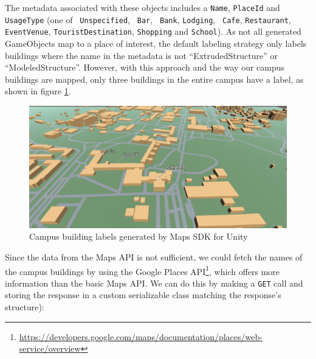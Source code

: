            The metadata associated with these objects includes a \texttt{Name}, \texttt{PlaceId} and \texttt{UsageType} (one of \texttt{ Unspecified}, \texttt{ Bar}, \texttt{ Bank}, \texttt{Lodging}, \texttt{ Cafe}, \texttt{Restaurant}, \texttt{EventVenue}, \texttt{TouristDestination}, \texttt{Shopping} and \texttt{School}). As not all generated GameObjects map to a place of interest, the default labeling strategy only labels buildings where the name in the metadata is not “ExtrudedStructure” or “ModeledStructure”. However, with this approach and the way our campus buildings are mapped, only three buildings in the entire campus have a label, as shown in figure \ref{3:fig:maps_sdk_for_unity_labels}.
            
            \begin{figure}[ht]
                \centering
                     \includegraphics[width=\textwidth]{figures/demos/maps_sdk_for_unity_labels.png}
                    \caption{Campus building labels generated by Maps SDK for Unity}
                    \label{3:fig:maps_sdk_for_unity_labels}
            \end{figure}
            
            Since the data from the Maps API is not sufficient, we could fetch the names of the campus buildings by using the Google Places API\footnote{\url{https://developers.google.com/maps/documentation/places/web-service/overview}}, which offers more information than the basic Maps API. We can do this by making a \texttt{GET} call and storing the response in a custom serializable class matching the response's structure):
            
